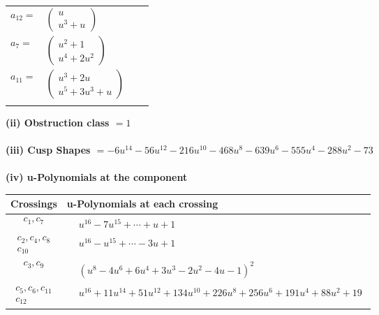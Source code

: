\documentclass[1p]{elsarticle_modified}
\theoremstyle{definition}
\begin{document}
\begin{tabular}{m{7pt} m{180pt} m{7pt} m{180pt} }
\flushright $a_{12}=$&$\begin{pmatrix}u\\u^3+u\end{pmatrix}$ \\
\flushright $a_{7}=$&$\begin{pmatrix}u^2+1\\u^4+2 u^2\end{pmatrix}$ \\
\flushright $a_{11}=$&$\begin{pmatrix}u^3+2 u\\u^5+3 u^3+u\end{pmatrix}$\\&\end{tabular}
\flushleft \textbf{(ii) Obstruction class $= 1$}\\~\\
\flushleft \textbf{(iii) Cusp Shapes $= -6 u^{14}-56 u^{12}-216 u^{10}-468 u^8-639 u^6-555 u^4-288 u^2-73$}\\~\\
\newpage\renewcommand{\arraystretch}{1}
\flushleft \textbf{(iv) u-Polynomials at the component}\newline \\
\begin{tabular}{m{50pt}|m{274pt}}
Crossings & \hspace{64pt}u-Polynomials at each crossing \\
\hline $$\begin{aligned}c_{1},c_{7}\end{aligned}$$&$\begin{aligned}
&u^{16}-7 u^{15}+\cdots+u+1
\end{aligned}$\\
\hline $$\begin{aligned}c_{2},c_{4},c_{8}\\c_{10}\end{aligned}$$&$\begin{aligned}
&u^{16}- u^{15}+\cdots-3 u+1
\end{aligned}$\\
\hline $$\begin{aligned}c_{3},c_{9}\end{aligned}$$&$\begin{aligned}
&(u^8-4 u^6+6 u^4+3 u^3-2 u^2-4 u-1)^2
\end{aligned}$\\
\hline $$\begin{aligned}c_{5},c_{6},c_{11}\\c_{12}\end{aligned}$$&$\begin{aligned}
&u^{16}+11 u^{14}+51 u^{12}+134 u^{10}+226 u^8+256 u^6+191 u^4+88 u^2+19
\end{aligned}$\\
\hline
\end{tabular}\\~\\
\end{document}
